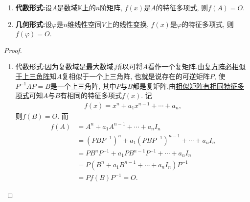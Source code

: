 \documentclass[../../main.tex]{subfiles}%
\begin{document}
\begin{theorem}\label{theorem:Cayley-Hamilton定理}
\begin{enumerate}
\item \textbf{代数形式:}设$A$是数域$\mathbb{K}$上的$n$阶矩阵, $f(x)$是$A$的特征多项式, 则$f(A) = O$.

\item \textbf{几何形式:}设$\varphi$是$n$维线性空间$V$上的线性变换, $f(x)$是$\varphi$的特征多项式, 则$f(\varphi) = O$.
\end{enumerate}
\end{theorem}
\begin{proof}
\begin{enumerate}
\item {\heiti 代数形式:}因为复数域是最大数域,所以可将$A$看作一个复矩阵.由\hyperref[theorem:复方阵必相似于上三角阵]{复方阵必相似于上三角阵}知$A$复相似于一个上三角阵, 也就是说存在的可逆矩阵$P$, 使$P^{-1}AP = B$是一个上三角阵, 其中$P$与$B$都是复矩阵,由\hyperref[theorem:相似矩阵有相同的特征多项式与特征值]{相似矩阵有相同特征多项式}可知$A$与$B$有相同的特征多项式$f(x)$. 记
\begin{align*}
f(x) = x^n + a_1 x^{n-1} + \cdots + a_n,
\end{align*}
则$f(B) = O$. 而
\begin{align*}
f(A) &= A^n + a_1 A^{n-1} + \cdots + a_n I_n \\
&= (PBP^{-1})^n + a_1 (PBP^{-1})^{n-1} + \cdots + a_n I_n \\
&= PB^n P^{-1} + a_1 PB^{n-1} P^{-1} + \cdots + a_n I_n \\
&= P(B^n + a_1 B^{n-1} + \cdots + a_n I_n)P^{-1} \\
&= P f(B) P^{-1} = O.
\end{align*}


\end{enumerate}
\end{proof}
\end{document}
